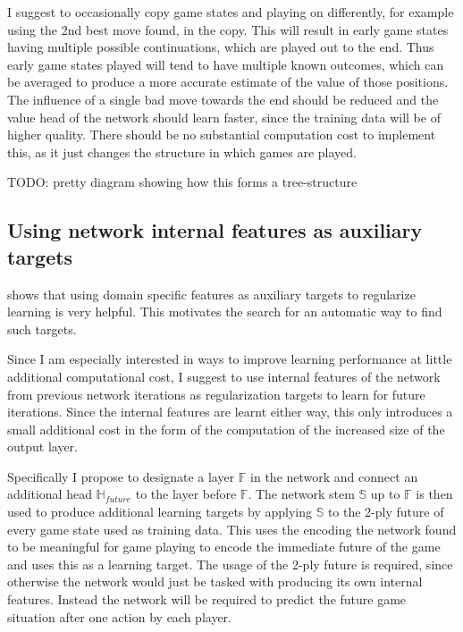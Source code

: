 \documentclass[12pt,onecolumn,oneside,titlepage]{article}
\begin{document}
I suggest to occasionally copy game states and playing on differently, for example using the 2nd best move found, in the copy.
This will result in early game states having multiple possible continuations, which are played out to the end. Thus early game states played will tend to have multiple known outcomes,
which can be averaged to produce a more accurate estimate of the value of those positions. The influence of a single bad move towards the end should be reduced and the value head of the network should learn faster, since the training data will be of higher quality.
There should be no substantial computation cost to implement this, as it just changes the structure in which games are played.

TODO: pretty diagram showing how this forms a tree-structure

\subsection{Using network internal features as auxiliary targets}

\cite{wu2019accelerating} shows that using domain specific features as auxiliary targets to regularize learning is very helpful. This motivates the search for an automatic way to find such targets.

Since I am especially interested in ways to improve learning performance at little additional computational cost, I suggest to use internal features of the network from previous network iterations as regularization targets to learn for future iterations.
Since the internal features are learnt either way, this only introduces a small additional cost in the form of the computation of the increased size of the output layer.

Specifically I propose to designate a layer $\mathbb{F}$ in the network and connect an additional head $\mathbb{H}_{future}$ to the layer before $\mathbb{F}$. 
The network stem $\mathbb{S}$ up to $\mathbb{F}$ is then used to produce additional learning targets by applying $\mathbb{S}$ to the 2-ply future of every game state used as training data.
This uses the encoding the network found to be meaningful for game playing to encode the immediate future of the game and uses this as a learning target. The usage of the 2-ply future is required, since otherwise the network would just be tasked with producing
its own internal features. Instead the network will be required to predict the future game situation after one action by each player.
\end{document}
